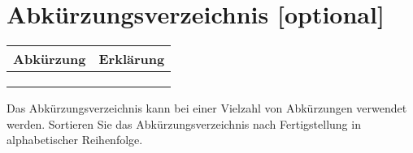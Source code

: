 \chapter{Abkürzungsverzeichnis [optional]}
\label{sec: Abkürzung}

\begin{table}[h]
	\centering
	\begin{tabular}{|p{3cm}|p{11.6cm}|}
		\hline
		\rowcolor{lightgray}\textbf{Abkürzung} & \textbf{Erklärung} \\
		\hline
		 & \\ 
		\hline
		 & \\ 
		\hline
		 & \\ 
		\hline
	\end{tabular}
\end{table}

\noindent Das Abkürzungsverzeichnis kann bei einer Vielzahl von Abkürzungen verwendet werden. Sortieren Sie das Abkürzungsverzeichnis nach Fertigstellung in alphabetischer Reihenfolge.

 
 


